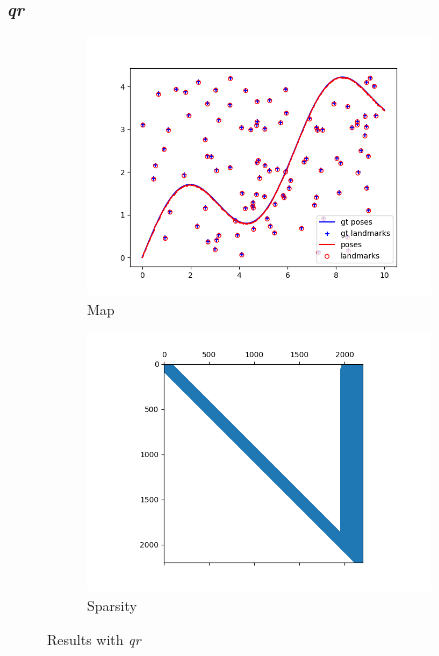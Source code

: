 \documentclass[12pt, a4paper]{article}
\begin{document}
\subsubsection{\textit{qr}}
\begin{figure}[H]
  \centering
  \begin{subfigure}[b]{0.45\textwidth}
    \includegraphics[width=\textwidth]{./results/linear/qr_2d_linear_map.png}
    \caption{Map}
  \end{subfigure}
  \hfill
  \begin{subfigure}[b]{0.45\textwidth}
    \includegraphics[width=\textwidth]{./results/linear/qr_2d_linear_sparsity.png}
    \caption{Sparsity}
  \end{subfigure}
  \caption{Results with \textit{qr}}
\end{figure}
\end{document}
